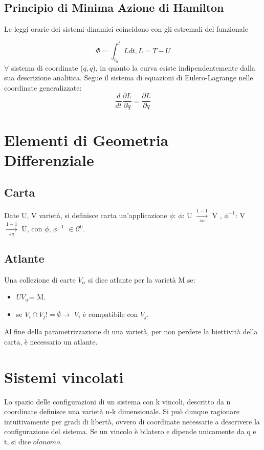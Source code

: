 \documentclass{article}
\begin{document}
\subsection{Principio di Minima Azione di Hamilton}

Le leggi orarie dei sistemi dinamici coincidono con gli estremali del funzionale 

\begin{equation}
    \Phi = \int_{t_0}^{t} L dt , L=T-U
\end{equation}
$\forall$ sistema di coordinate ($q, \dot q$), in quanto la curva esiste indipendentemente dalla sua descrizione analitica.
Segue il sistema di equazioni di Eulero-Lagrange nelle coordinate generalizzate:
\begin{equation}
    \frac{d}{dt}\frac{\partial L}{\partial \dot q}= \frac{\partial L}{\partial q}
\end{equation}

\section{Elementi di Geometria Differenziale}

\subsection{Carta}
Date U, V varietà,  si definisce carta un'applicazione $\phi$: $\phi$: U $\xrightarrow[su]{1-1}$ V , $\phi^{-1}$: V $\xrightarrow[su]{1-1}$ U, con $\phi$, $\phi^{-1}$ $\in$$ \mathcal{C}^0$.

\subsection{Atlante}
Una collezione di carte $V_\alpha$ si dice atlante per la varietà M se:
\begin{itemize}
    \item $U V_\alpha$= M.
    \item se $V_i \cap V_j != \emptyset \rightarrow$ $V_i$ è compatibile con $V_j$.
\end{itemize}
Al fine della parametrizzazione di una varietà, per non perdere la biettività della carta, è necessario un atlante.

\section{Sistemi vincolati}
Lo spazio delle configurazioni di un sistema con k vincoli, descritto da n coordinate definisce una varietà n-k dimensionale. Si può dunque ragionare intuitivamente per gradi di libertà, ovvero di coordinate necessarie a descrivere la configurazione del sistema.
Se un vincolo è bilatero e dipende unicamente da q e t, si dice $olonomo$.
\end{document}
